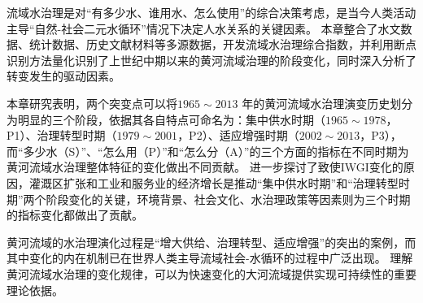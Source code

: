 流域水治理是对“有多少水、谁用水、怎么使用”的综合决策考虑，是当今人类活动主导“自然-社会二元水循环”情况下决定人水关系的关键因素。
本章整合了水文数据、统计数据、历史文献材料等多源数据，开发流域水治理综合指数，并利用断点识别方法量化识别了上世纪中期以来的黄河流域治理的阶段变化，同时深入分析了转变发生的驱动因素。

本章研究表明，两个突变点可以将$1965 \sim 2013$ 年的黄河流域水治理演变历史划分为明显的三个阶段，依据其各自特点可命名为：集中供水时期（$1965 \sim 1978$，P1）、治理转型时期（$1979 \sim 2001$，P2）、适应增强时期（$2002 \sim 2013$，P3），而“多少水（S）”、“怎么用（P）”和“怎么分（A）”的三个方面的指标在不同时期为黄河流域水治理整体特征的变化做出不同贡献。
进一步探讨了致使IWGI变化的原因，灌溉区扩张和工业和服务业的经济增长是推动“集中供水时期”和“治理转型时期”两个阶段变化的关键，环境背景、社会文化、水治理政策等因素则为三个时期的指标变化都做出了贡献。

黄河流域的水治理演化过程是“增大供给、治理转型、适应增强”的突出的案例，而其中变化的内在机制已在世界人类主导流域社会-水循环的过程中广泛出现。
理解黄河流域水治理的变化规律，可以为快速变化的大河流域提供实现可持续性的重要理论依据。
